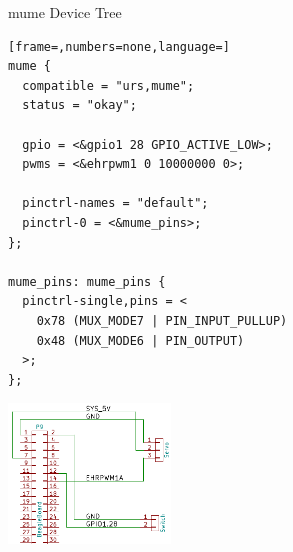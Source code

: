 \begin{frame}[fragile]{mume Device Tree}
	\begin{multicols}{2}
		\begin{lstlisting}[frame=,numbers=none,language=]
mume {
  compatible = "urs,mume";
  status = "okay";

  gpio = <&gpio1 28 GPIO_ACTIVE_LOW>;
  pwms = <&ehrpwm1 0 10000000 0>;

  pinctrl-names = "default";
  pinctrl-0 = <&mume_pins>;
};

mume_pins: mume_pins {
  pinctrl-single,pins = <
    0x78 (MUX_MODE7 | PIN_INPUT_PULLUP)
    0x48 (MUX_MODE6 | PIN_OUTPUT)
  >;
};
		\end{lstlisting}
\pagebreak
		\begin{flushright}
		\includegraphics[width=4.3cm]{res/mume_schematic.pdf}
		\end{flushright}
	\end{multicols}
\end{frame}

